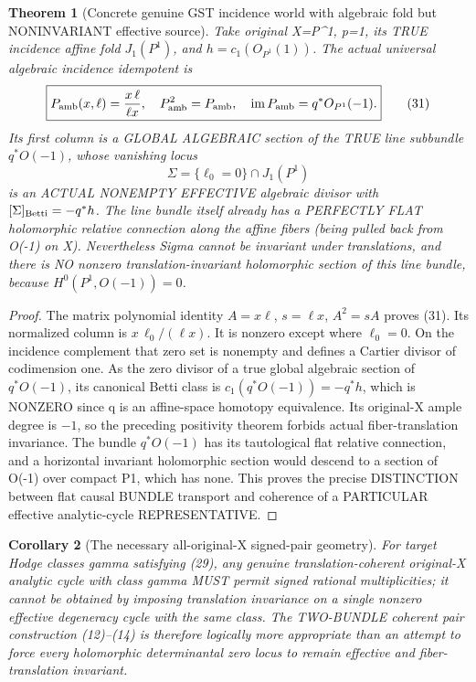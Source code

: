 \documentclass[11pt]{article}
\newtheorem{theorem}{Theorem}
\newtheorem{corollary}[theorem]{Corollary}
\begin{document}
\begin{theorem}[Concrete genuine GST incidence world with algebraic fold but NONINVARIANT effective source]
Take original X=P^1,
p=1, its TRUE incidence
affine fold $J_1(P^1)$, and
$h=c_1(O_{P^1}(1))$.
The actual universal algebraic
incidence idempotent is
\[
 \boxed{
 P_{\rm amb}(x,\ell)=
   \frac{x\,\ell}{\ell x},
 \quad P_{\rm amb}^2=P_{\rm amb},
 \quad\operatorname{im}P_{\rm amb}
       =q^*O_{P^1}(-1).
 }                                                       \tag{31}
\]
Its first column is a
GLOBAL ALGEBRAIC section
of the TRUE line subbundle
$q^*O(-1)$, whose vanishing
locus
\[
 \boxed{
 \Sigma=\{\ell_0=0\}\cap J_1(P^1)
 }                                                       \tag{32}
\]
is an ACTUAL NONEMPTY EFFECTIVE
algebraic divisor with
$[\Sigma]_{\rm Betti}=-q^*h$.
The line bundle itself
already has a PERFECTLY FLAT
holomorphic relative connection
along the affine fibers (being
pulled back from O(-1) on X).
Nevertheless Sigma cannot
be invariant under translations,
and there is NO nonzero
translation-invariant holomorphic
section of this line bundle,
because $H^0(P^1,O(-1))=0$.
\end{theorem}
\begin{proof}
The matrix polynomial identity
$A=x\ell$, $s=\ell x$,
$A^2=sA$ proves (31).
Its normalized column is
$x\,\ell_0/(\ell x)$.
It is nonzero except where
$\ell_0=0$. On the incidence
complement that zero set is
nonempty and defines a
Cartier divisor of codimension
one. As the zero divisor
of a true global algebraic
section of $q^*O(-1)$,
its canonical Betti class is
$c_1(q^*O(-1))=-q^*h$,
which is NONZERO since q
is an affine-space homotopy
equivalence. Its original-X
ample degree is $-1$,
so the preceding positivity
theorem forbids actual
fiber-translation invariance.
The bundle $q^*O(-1)$ has
its tautological flat relative
connection, and a horizontal
invariant holomorphic section
would descend to a section
of O(-1) over compact P1,
which has none. This proves
the precise DISTINCTION
between flat causal BUNDLE
transport and coherence of
a PARTICULAR effective
analytic-cycle REPRESENTATIVE.
\end{proof}

\begin{corollary}[The necessary all-original-X signed-pair geometry]
For target Hodge classes gamma
satisfying (29), any genuine
translation-coherent original-X
analytic cycle with class gamma
MUST permit signed rational
multiplicities; it cannot be
obtained by imposing translation
invariance on a single
nonzero effective degeneracy
cycle with the same class.
The TWO-BUNDLE coherent
pair construction (12)--(14)
is therefore logically more
appropriate than an attempt
to force every holomorphic
determinantal zero locus to
remain effective and
fiber-translation invariant.
\end{corollary}
\end{document}
